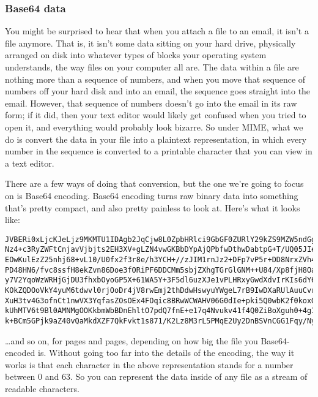 \documentclass[11pt]{article}
\begin{document}
\subsubsection{Base64 data}
\label{sec:orgba9d1eb}

You might be surprised to hear that when you attach a file to an
email, it isn't a file anymore.  That is, it isn't some data sitting
on your hard drive, physically arranged on disk into whatever types of
blocks your operating system understands, the way files on your
computer all are.  The data within a file are nothing more than a
sequence of numbers, and when you move that sequence of numbers off
your hard disk and into an email, the sequence goes straight into the
email.  However, that sequence of numbers doesn't go into the email in
its raw form; if it did, then your text editor would likely get
confused when you tried to open it, and everything would probably look
bizarre.  So under MIME, what we do is convert the data in your file
into a plaintext representation, in which every number in the sequence
is converted to a printable character that you can view in a text
editor.

There are a few ways of doing that conversion, but the one we're going
to focus on is Base64 encoding.  Base64 encoding turns raw binary data
into something that's pretty compact, and also pretty painless to look
at.  Here's what it looks like:

\begin{verbatim}
JVBERi0xLjcKJeLjz9MKMTU1IDAgb2JqCjw8L0ZpbHRlci9GbGF0ZURlY29kZS9MZW5ndGggMTI1
Nz4+c3RyZWFtCnjavVjbjts2EH3XV+gLZN4vwGKBbDYpAjQPbfwDthwDabtpG+T/UQ05JIeySCtp
EOwKulEzZ25nhj68+vL10/U0fx2f3r8e/h3YCH+//zJIM1rnJz2+DFp7vP5r+DD8NrxZVh4+/HP6
PD48HN6/fvc8ssfH8ekZvn86Doe3fORiPF6DDCMm5sbjZXhgTGrGlGNM++U84/Xp8fjH8Oa4KZdv
y7V2YqoWzWRHjGjDU3fhxbOyoGP5X+61WA5Y+3F5dl6uzXJe1vPLHRxyGwdXdvIrKIs6dY6qQa0A
KOkZQDOoVkY4yuM6tdwvl0rjOoDr4jV8rwEmj2thDdwHswyuYWgeL7rB9IwDXaRUlAuuCvrn6JKw
XuH3tv4G3ofnCt1nwVX3YqfasZOsOEx4FOqic8BRwWCWAHV06G0dIe+pki5Q0wbK2f0koxG5m0i2
kUhMTV6t9Bl0AMNMgOOKkbmWbBDnEhltO7pdQ7fnE+e17q4Nvukv41f4Q0ZiBoXguh0+4g1S4sBw
k+BCm5GPjk9aZ40vQaMkdXZF7QkFvkt1s871/K2Lz8M3rL5PMqE2Uy2DnBSVnCGG1Fqy/NyzuEGX
\end{verbatim}

\ldots{}and so on, for pages and pages, depending on how big the file you
Base64-encoded is.  Without going too far into the details of the
encoding, the way it works is that each character in the above
representation stands for a number between 0 and 63.  So you can
represent the data inside of any file as a stream of readable
characters.
\end{document}
